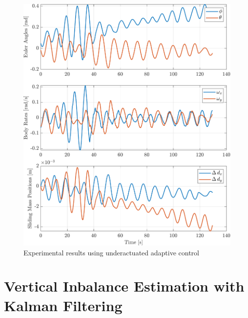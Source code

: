 \begin{figure}[ht]
    \centering
    \includegraphics[width=\linewidth]{plots/adaptive_hardware_failure.pdf}
    \caption{Experimental results using underactuated adaptive control}
\end{figure}


\section{Vertical Inbalance Estimation with Kalman Filtering}

